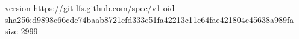 version https://git-lfs.github.com/spec/v1
oid sha256:d9898c66cde74baab8721cfd333c51fa42213c11c64fae421804c45638a989fa
size 2999
